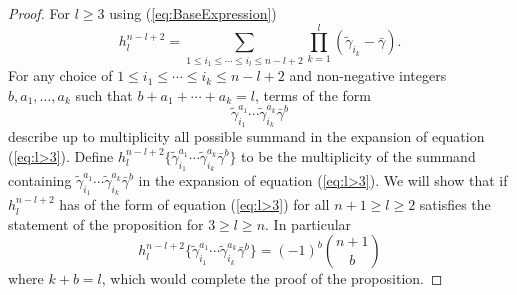 \documentclass{article}
\theoremstyle{plain}
\theoremstyle{definition}
\numberwithin{thm}{section}
\begin{document}
\begin{proof}
				For $l\geq 3$ using (\ref{eq:BaseExpression})
				\begin{equation}\label{eq:l>3}
					h^{n-l+2}_l=\sum_{1\leq i_1\leq \cdots\leq i_l \leq n-l+2}{\prod_{k=1}^{l}{(\tilde{\gamma}_{i_k}-\bar{\gamma})}}.
				\end{equation}
				For any choice of $1\leq i_1\leq \cdots \leq i_k \leq n-l+2$ and non-negative integers $b,a_1,\dots,a_k$ such that $b+a_1+\cdots+a_k=l$,
				terms of the form
				\begin{equation}\label{eq:ProdChoice}
					\tilde{\gamma}_{i_1}^{a_1}\cdots\tilde{\gamma}_{i_k}^{a_k}\bar{\gamma}^{b}
				\end{equation}
				describe up to multiplicity all possible summand in the expansion of equation (\ref{eq:l>3}).
				Define $h^{n-l+2}_l\{ \tilde{\gamma}_{i_1}^{a_1}\cdots\tilde{\gamma}_{i_k}^{a_k}\bar{\gamma}^{b} \}$ to be the multiplicity of the summand containing
				$\tilde{\gamma}_{i_1}^{a_1}\cdots\tilde{\gamma}_{i_k}^{a_k}\bar{\gamma}^{b}$ in the expansion of equation (\ref{eq:l>3}).
				We will show that if $h^{n-l+2}_l$ has of the form of equation (\ref{eq:l>3}) for all $n+1\geq l \geq 2$ satisfies the statement of the proposition
				for $3\geq l\geq n$. 
				In particular
				\begin{equation}\label{eq:BorckekenExpress}
					h^{n-l+2}_l\{ \tilde{\gamma}_{i_1}^{a_1}\cdots\tilde{\gamma}_{i_k}^{a_k}\bar{\gamma}^{b} \} = (-1)^{b} \binom{n+1}{b}
				\end{equation}
				where $k+b=l$,
				which would complete the proof of the proposition.
				

\end{proof}
\end{document}
